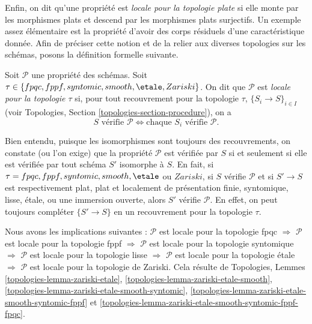 \medskip\noindent
Enfin, on dit qu'une propriété est {\it locale pour la topologie plate}
si elle monte par les morphismes plats et descend par les morphismes plats
surjectifs. Un exemple assez élémentaire est la propriété d'avoir des corps
résiduels d'une caractéristique donnée. Afin de préciser cette notion et de
la relier aux diverses topologies sur les schémas, posons la définition
formelle suivante.

\begin{definition}
\label{definition-property-local}
Soit $\mathcal{P}$ une propriété des schémas. Soit
$\tau \in \{fpqc, \linebreak[0] fppf, \linebreak[0] syntomic, \linebreak[0]
smooth, \linebreak[0] \etale, \linebreak[0] Zariski\}$. On dit que
$\mathcal{P}$ est {\it locale pour la topologie $\tau$} si, pour tout
recouvrement pour la topologie $\tau$, $\{S_i \to S\}_{i \in I}$ (voir
Topologies, Section \ref{topologies-section-procedure}), on a
$$
S \text{ vérifie }\mathcal{P}
\Leftrightarrow
\text{chaque }S_i \text{ vérifie }\mathcal{P}.
$$
\end{definition}

\noindent
Bien entendu, puisque les isomorphismes sont toujours des recouvrements,
on constate (ou l'on exige) que la propriété $\mathcal{P}$ est vérifiée par
$S$ si et seulement si elle est vérifiée par tout schéma $S'$ isomorphe à
$S$. En fait, si
$\tau = fpqc, \linebreak[0] fppf, \linebreak[0] syntomic,
\linebreak[0] smooth, \linebreak[0] \etale$ ou $Zariski$, si $S$ vérifie
$\mathcal{P}$ et si $S' \to S$ est respectivement plat, plat et localement
de présentation finie, syntomique, lisse, \'etale, ou une immersion ouverte,
alors $S'$ vérifie $\mathcal{P}$. En effet, on peut toujours compléter
$\{S' \to S\}$ en un recouvrement pour la topologie $\tau$.

\medskip\noindent
Nous avons les implications suivantes :
$\mathcal{P}$ est locale pour la topologie fpqc
$\Rightarrow$
$\mathcal{P}$ est locale pour la topologie fppf
$\Rightarrow$
$\mathcal{P}$ est locale pour la topologie syntomique
$\Rightarrow$
$\mathcal{P}$ est locale pour la topologie lisse
$\Rightarrow$
$\mathcal{P}$ est locale pour la topologie \'etale
$\Rightarrow$
$\mathcal{P}$ est locale pour la topologie de Zariski.
Cela résulte de Topologies, Lemmes
\ref{topologies-lemma-zariski-etale},
\ref{topologies-lemma-zariski-etale-smooth},
\ref{topologies-lemma-zariski-etale-smooth-syntomic},
\ref{topologies-lemma-zariski-etale-smooth-syntomic-fppf} et
\ref{topologies-lemma-zariski-etale-smooth-syntomic-fppf-fpqc}.

